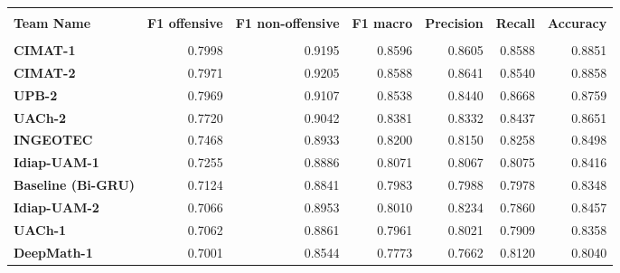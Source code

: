 \begin{table}[H]
    \centering
    \changefontsizes{9pt}
    \begin{tabular}{lrrrrrr} \hline
        \\
        \textbf{Team Name}          & \textbf{F1 offensive} & \textbf{F1 non-offensive} & \textbf{F1 macro} & \textbf{Precision} & \textbf{Recall} & \textbf{Accuracy} \\ \hline
        \\[-0.1cm]
        \textbf{CIMAT-1}            & 0.7998                & 0.9195                    & 0.8596            & 0.8605             & 0.8588          & 0.8851            \\[0.05cm]
        \textbf{CIMAT-2}            & 0.7971                & 0.9205                    & 0.8588            & 0.8641             & 0.8540          & 0.8858            \\[0.05cm]
        \textbf{UPB-2}              & 0.7969                & 0.9107                    & 0.8538            & 0.8440             & 0.8668          & 0.8759            \\[0.05cm]
        \textbf{UACh-2}             & 0.7720                & 0.9042                    & 0.8381            & 0.8332             & 0.8437          & 0.8651            \\[0.05cm]
        \textbf{INGEOTEC}           & 0.7468                & 0.8933                    & 0.8200            & 0.8150             & 0.8258          & 0.8498            \\[0.05cm]
        \textbf{Idiap-UAM-1}        & 0.7255                & 0.8886                    & 0.8071            & 0.8067             & 0.8075          & 0.8416            \\[0.05cm]
        \textbf{Baseline (Bi-GRU)}  & 0.7124                & 0.8841                    & 0.7983            & 0.7988             & 0.7978          & 0.8348            \\[0.05cm]
        \textbf{Idiap-UAM-2}        & 0.7066                & 0.8953                    & 0.8010            & 0.8234             & 0.7860          & 0.8457            \\[0.05cm]
        \textbf{UACh-1}             & 0.7062                & 0.8861                    & 0.7961            & 0.8021             & 0.7909          & 0.8358            \\[0.05cm]
        \textbf{DeepMath-1}         & 0.7001                & 0.8544                    & 0.7773            & 0.7662             & 0.8120          & 0.8040            \\[0.05cm]

\end{tabular}
\end{table}
